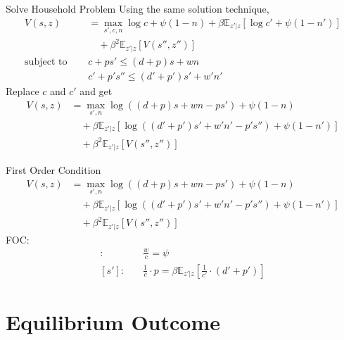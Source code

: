 \documentclass[aspectratio=169,xcolor=dvipsnames]{beamer}
\begin{document}
\begin{frame}{Solve Household Problem}
\label{slide:Solve_Household_Problem}
    Using the same solution technique,
    \begin{align}
        V(s, z)
            & = \max_{s', c, n} \log c + \psi (1-n) + \beta \mathbb{E}_{z'|z}[\log c' + \psi (1-n')]
        \\
            & \quad + \beta^{2} \mathbb{E}_{z'|z} [V(s'', z'')]
        \\
        \text{subject to } \quad
            & c + ps' \le (d + p)s + wn
        \\
            & c' + p's'' \le (d' + p') s' + w' n'
    \end{align}
    Replace $ c $ and $ c' $ and get
    \begin{align}
        V(s, z)
            & = \max_{s', n} \log((d+p)s + wn - p s') + \psi (1-n)
        \\
            & \quad + \beta \mathbb{E}_{z'|z} [\log((d'+p')s' + w'n' - p's'') + \psi (1 - n')]
        \\
            & \quad + \beta^{2} \mathbb{E}_{z'|z} [V(s'', z'')]
    \end{align}
\end{frame}

\begin{frame}{First Order Condition}
\label{slide:First_Order_Condition}
    \begin{align}
        V(s, z)
            & = \max_{s', n} \log((d+p)s + wn - p s') + \psi (1-n)
        \\
            & \quad + \beta \mathbb{E}_{z'|z} [\log((d'+p')s' + w'n' - p's'') + \psi (1 - n')]
        \\
            & \quad + \beta^{2} \mathbb{E}_{z'|z} [V(s'', z'')]
    \end{align}
    FOC:
    \begin{align}
        [n]: \quad
            & \frac{w}{c} = \psi
        \\
        [s']: \quad
            & \frac{1}{c} \cdot p = \beta \mathbb{E}_{z'|z} \left[
                \frac{1}{c'} \cdot (d' + p')
            \right]
    \end{align}
\end{frame}

\section[Eqm]{Equilibrium Outcome}
\label{sec:Equilibrium_Outcome}
\end{document}

